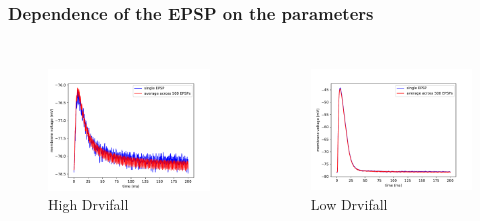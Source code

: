 \documentclass{beamer}
\begin{document}
\begin{frame}
	\frametitle{Dependence of the EPSP on the parameters}
	\begin{columns}
          	\begin{figure}
    				\centering
    				\includegraphics[width=\linewidth]{figures/epsp_fall_+.pdf}
    				High Drvifall
 		   \end{figure}

          \begin{figure}
    				\centering
    				\includegraphics[width=\linewidth]{figures/epsp_fall_-.pdf}
    				Low Drvifall
 		   \end{figure}
	\end{columns}


\end{frame}
\end{document}
